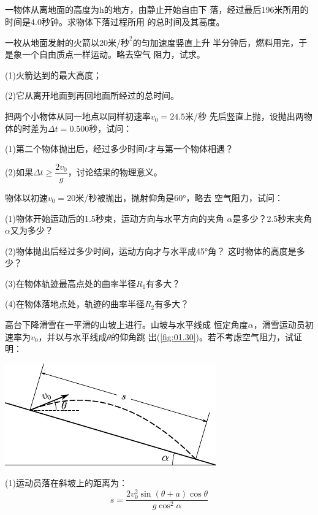 \exercise 一物体从离地面的高度为h的地方，由静止开始自由下
落，经过最后196米所用的时间是4.0秒钟。求物体下落过程所用
的总时间及其高度。

\exercise 一枚从地面发射的火箭以20米/$\text{秒}^2$的匀加速度竖直上升
半分钟后，燃料用完，于是象一个自由质点一样运动。略去空气
阻力，试求。

(1)火箭达到的最大高度；

(2)它从离开地面到再回地面所经过的总时间。

\exercise 把两个小物体从同一地点以同样初速率$v_0=24.5$米/秒
先后竖直上抛，设抛出两物体的时差为$\Delta t=0.500$秒，试问：

\renewcommand{\hsp}{\hspace{0.2em}}
{(1)第二个物体抛出后，经过多少时间\hsp $t$\hsp 才与第一个物体相遇？}

\vspace{-0.15em}(2)如果$\Delta t\geqslant\dfrac{2v_0}{g}$，讨论结果的物理意义。\vspace{-0.15em}

\exercise 物体以初速$v_0=20$米/秒被抛出，抛射仰角是\ang{60;;}，略去
空气阻力，试问：

(1)物体开始运动后的1.5秒束，运动方向与水平方向的夹角
$\alpha$是多少？2.5秒末夹角$\alpha$又为多少？

(2)物体抛出后经过多少时间，运动方向才与水平成\ang{45;;}角？
这时物体的高度是多少？

(3)在物体轨迹最高点处的曲率半径$R_1$有多大？

(4)在物体落地点处，轨迹的曲率半径$R_2$有多大？

\exercise 高台下降滑雪在一平滑的山坡上进行。山坡与水平线成
恒定角度$\alpha$，滑雪运动员初速率为$v_0$，并以与水平线成$\theta$的仰角跳
出(\ref{fig:01.30})。若不考虑空气阻力，试证明：
\begin{figurex}
    \centering
    \includegraphics{figure/fig01.30}
    \caption{}
    \label{fig:01.30}
\end{figurex}

(1)运动员落在斜坡上的距离为：
\begin{equation*}
    s=\frac{2 v_{0}^{2} \sin (\theta+a) \cos \theta}{g \cos ^{2} \alpha}
\end{equation*}

